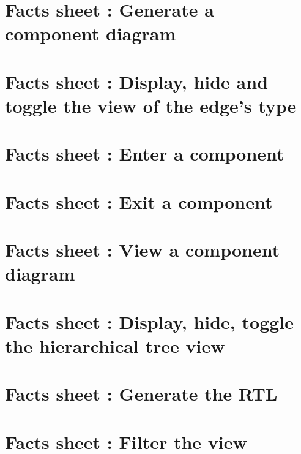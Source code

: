 \documentclass[a4paper,11pt]{report}
\begin{document}

 \tableofcontents

 
 
 
 
 
 
 

 \printbibliography

 \begin{appendices}

 \chapter{Facts sheet : Generate a component diagram}
 

 \chapter{Facts sheet : Display, hide and toggle the view of the edge's type}
 

 \chapter{Facts sheet : Enter a component}
 

 \chapter{Facts sheet : Exit a component}
 

 \chapter{Facts sheet : View a component diagram}
 

 \chapter{Facts sheet : Display, hide, toggle the hierarchical tree view}
 

 \chapter{Facts sheet : Generate the RTL}
 

 \chapter{Facts sheet : Filter the view}
 

\end{appendices}
\end{document}
